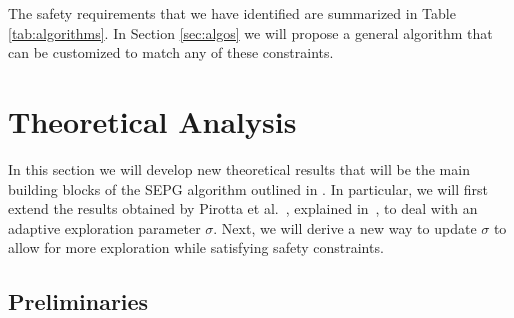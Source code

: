 \begin{samepage}
\begin{table}
	\caption{Overview of the safety requirements outlined in Section \ref{sec:framework}.}\label{tab:algorithms}
\end{table}

The safety requirements that we have identified are summarized in Table \ref{tab:algorithms}. In 
Section \ref{sec:algos} we will propose a general algorithm that can be customized to match any of these constraints.
\end{samepage}

\section{Theoretical Analysis}\label{sec:theory}
In this section we will develop new theoretical results that will be the main building blocks of the SEPG algorithm outlined in . In particular, we will first extend the results obtained by Pirotta et al.~\cite{adaptive_step}, explained in~, to deal with an adaptive exploration parameter $\sigma$. Next, we will derive a new way to update $\sigma$ to allow for more exploration while satisfying safety constraints. 

\subsection{Preliminaries}

